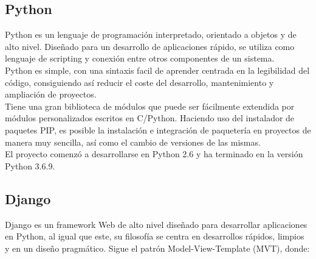 \documentclass[11pt,a4paper]{book}
\begin{document}
			\subsection{Python}
				Python es un lenguaje de programación interpretado, orientado a objetos y de alto nivel. Diseñado para un desarrollo de aplicaciones rápido, se utiliza como lenguaje de scripting y conexión entre otros componentes de un sistema.\\
				
				
				Python es simple, con una sintaxis facil de aprender centrada en la legibilidad del código, consiguiendo así reducir el coste del desarrollo, mantenimiento y ampliación de proyectos.\\
				
				
				Tiene una gran biblioteca de módulos que puede ser fácilmente extendida por módulos personalizados escritos en C/Python. Haciendo uso del instalador de paquetes PIP, es posible la instalación e integración de paquetería en proyectos de manera muy sencilla, así como el cambio de versiones de las mismas.\\
				
				El proyecto comenzó a desarrollarse en Python 2.6 y ha terminado en la versión Python 3.6.9.
				
				
			\subsection{Django}
				Django es un framework Web de alto nivel diseñado para desarrollar aplicaciones en Python, al igual que este, su filosofía se centra en desarrollos rápidos, limpios y en un diseño pragmático.
				Sigue el patrón Model-View-Template (MVT), donde:\\
				
\end{document}
